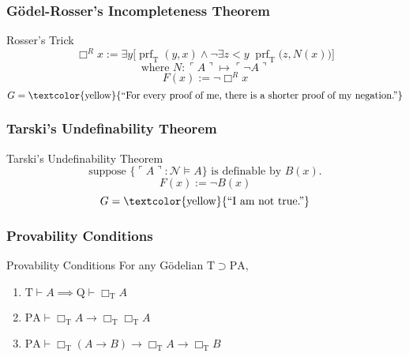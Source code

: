 \documentclass[UTF8,aspectratio=43,11pt,colorlinks,compress,openany]{beamer}%
\begin{document}
\begin{frame}\frametitle{G\"odel-Rosser's Incompleteness Theorem}
\setlength\abovedisplayskip{0pt}
\setlength\belowdisplayskip{0pt}\vspace{-1ex}
	\begin{block}{Rosser's Trick}
		\[\Box ^R x:=\exists y\big[\operatorname{prf}_{\mathrm{T}}(y,x)\wedge\neg\exists z<y\;\operatorname{prf}_{\mathrm{T}}\big(z,N(x)\big)\big]\]
		\[\text{where } N:\ulcorner A\urcorner\mapsto\ulcorner\neg A\urcorner\]
		\[F(x):=\neg\Box ^R x\]
		\[G=\text{\textcolor{yellow}{``For every proof of me, there is a shorter proof of my negation.''}}\]
	\end{block}
\end{frame}

\begin{frame}\frametitle{Tarski's Undefinability Theorem}
	\begin{block}{Tarski's Undefinability Theorem}
		\[\text{suppose $\big\{\ulcorner A\urcorner:\mathcal{N}\vDash A\big\}$ is definable by $B(x)$.}\]
		\[F(x):=\neg B(x)\]
		\[G=\text{\textcolor{yellow}{``I am not true.''}}\]
	\end{block}
\end{frame}

\begin{frame}\frametitle{Provability Conditions}
		\begin{block}{Provability Conditions}
			For any G\"odelian $\mathrm{T}\supset \mathrm{PA} $,
			\begin{enumerate}
				\item $\mathrm{T}\vdash A\implies \mathrm{Q}\vdash\Box_{\mathrm{T}}A$
				\item $\mathrm{PA}\vdash\Box_{\mathrm{T}}A\to\Box_{\mathrm{T}}\Box_{\mathrm{T}}A$
				\item $\mathrm{PA}\vdash\Box_{\mathrm{T}}(A\to B)\to\Box_{\mathrm{T}}A\to\Box_{\mathrm{T}}B$
			\end{enumerate}
		\end{block}
\end{frame}
\end{document}
